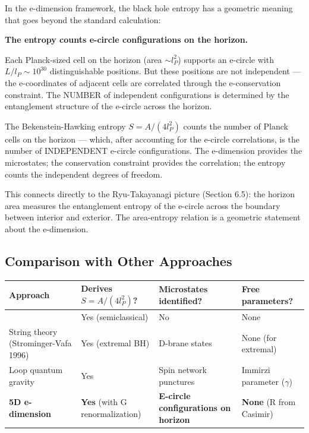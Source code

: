 \documentclass[aps,prd,preprint,superscriptaddress,longbibliography,floatfix]{revtex4-2}
\theoremstyle{remark}
\begin{document}
In the e-dimension framework, the black hole entropy has a geometric meaning that goes beyond the standard calculation:

\textbf{The entropy counts e-circle configurations on the horizon.}

Each Planck-sized cell on the horizon (area $\sim  l_P^{2}$) supports an e-circle with $L/l_P \sim  10^{30}$ distinguishable positions. But these positions are not independent --- the e-coordinates of adjacent cells are correlated through the e-conservation constraint. The NUMBER of independent configurations is determined by the entanglement structure of the e-circle across the horizon.

The Bekenstein-Hawking entropy $S = A/(4l_P^{2})$ counts the number of Planck cells on the horizon --- which, after accounting for the e-circle correlations, is the number of INDEPENDENT e-circle configurations. The e-dimension provides the microstates; the conservation constraint provides the correlation; the entropy counts the independent degrees of freedom.

This connects directly to the Ryu-Takayanagi picture (Section 6.5): the horizon area measures the entanglement entropy of the e-circle across the boundary between interior and exterior. The area-entropy relation is a geometric statement about the e-dimension.



\subsection{Comparison with Other Approaches}


\begin{table}[H]
\begin{ruledtabular}
\begin{tabular}{p{3.8cm}p{3.8cm}p{3.8cm}p{3.8cm}}
Approach & Derives $S = A/(4l_P^{2})$? & Microstates identified? & Free parameters? \\
\hline
\cite{Hawking1975} & Yes (semiclassical) & No & None \\
String theory (Strominger-Vafa 1996) & Yes (extremal BH) & D-brane states & None (for extremal) \\
Loop quantum gravity & Yes & Spin network punctures & Immirzi parameter ($\gamma$) \\
\textbf{5D e-dimension} & \textbf{Yes} (with G renormalization) & \textbf{E-circle configurations on horizon} & \textbf{None} (R from Casimir) \\
\end{tabular}
\end{ruledtabular}
\end{table}
\end{document}
